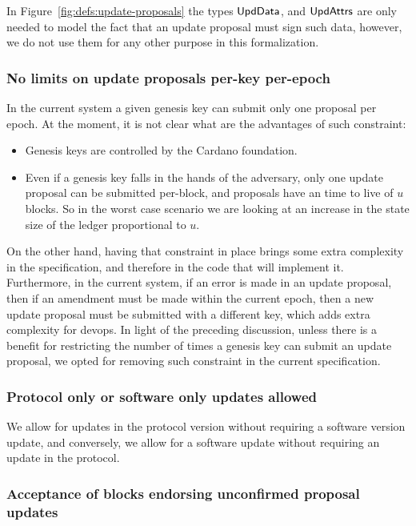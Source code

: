 In Figure~\ref{fig:defs:update-proposals} the types
$\mathsf{UpdData}$, and $\mathsf{UpdAttrs}$ are only needed to model the fact that
an update proposal must sign such data, however, we do not use them for any
other purpose in this formalization.

\subsubsection{No limits on update proposals per-key per-epoch}
\label{sec:no-up-limits}

In the current system a given genesis key can submit only one proposal per
epoch. At the moment, it is not clear what are the advantages of such
constraint:
\begin{itemize}
\item Genesis keys are controlled by the Cardano foundation.
\item Even if a genesis key falls in the hands of the adversary, only one
  update proposal can be submitted per-block, and proposals have an time to
  live of $u$ blocks. So in the worst case scenario we are looking at an
  increase in the state size of the ledger proportional to $u$.
\end{itemize}
On the other hand, having that constraint in place brings some extra complexity
in the specification, and therefore in the code that will implement it.
Furthermore, in the current system, if an error is made in an update proposal,
then if an amendment must be made within the current epoch, then a new update
proposal must be submitted with a different key, which adds extra complexity
for devops. In light of the preceding discussion, unless there is a benefit for
restricting the number of times a genesis key can submit an update proposal, we
opted for removing such constraint in the current specification.

\subsubsection{Protocol only or software only updates allowed}
\label{sec:ptonly-or-swonly-allowed}

We allow for updates in the protocol version without requiring a software
version update, and conversely, we allow for a software update without
requiring an update in the protocol.

\subsubsection{Acceptance of blocks endorsing unconfirmed proposal updates}
\label{sec:acceptance-of-uncofirmed-up-endorsements}

